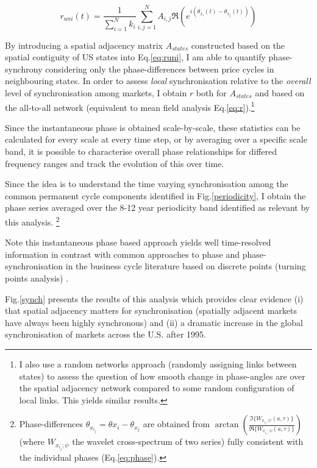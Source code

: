 \documentclass[11pt]{article}
\begin{document}
\begin{equation}
 r_{uni}(t)=\frac{1}{\sum_{i=1}^{N}{k_i}}\sum_{i,j=1}^{N}A_{i,j}\mathfrak{R}\left(e^{i(\theta_{x_i}(t)-\theta_{x_j}(t))}\right)
 \label{eq:runi}
\end{equation}

By introducing a spatial adjacency matrix $A_{states}$ constructed based on the spatial contiguity of US states into Eq.\ref{eq:runi}, I am able to quantify phase-synchrony considering only the phase-differences between price cycles in neighbouring states. In order to assess \textit{local} synchronisation relative to the \textit{overall} level of synchronisation among markets, I obtain $r$ both for $A_{states}$ and based on the all-to-all network (equivalent to mean field analysis Eq.\ref{eq:r}).\footnote{I also use a random networks approach (randomly assigning links between states) to assess the question of how smooth change in phase-angles are over the spatial adjacency network compared to some random configuration of local links. This yields similar results.}

Since the instantaneous phase is obtained scale-by-scale, these statistics can be calculated for every scale at every time step, or by averaging over a specific scale band, it is possible to characterise overall phase relationships for differed frequency ranges and track the evolution of this over time.

Since the idea is to understand the time varying synchronisation among the common permanent cycle components identified in Fig.\ref{periodicity}, I obtain the phase series %
averaged over the  8-12 year periodicity band identified as relevant by this analysis. \footnote{Phase-differences \(\theta_{x_{i_j}}=\theta{x_i}-\theta_{x_j}\) are obtained from \(\arctan{\left(\frac{\mathfrak{I}\{W_{x_{i_j};\psi} (a,\tau)\}}{\mathfrak{R}\{W_{x_{i_j};\psi} (a,\tau)\}}\right)}\) (where \(W_{x_{i_j};\psi}\) the wavelet cross-spectrum of two series) fully consistent with the individual phases (Eq.\ref{eq:phase}).}

Note this instantaneous phase based approach yields well time-resolved information in contrast with common approaches to phase and phase-synchronisation in the business cycle literature based on discrete points (turning points analysis) \citep{Harding2003,Harding2006,Harding2002}.

Fig.\ref{synch} presents the results of this analysis which provides clear evidence (i) that spatial adjacency matters for synchronisation (spatially adjacent markets have always been highly synchronous) and (ii) a dramatic increase in the global synchronisation of markets across the U.S. after 1995.
\end{document}
